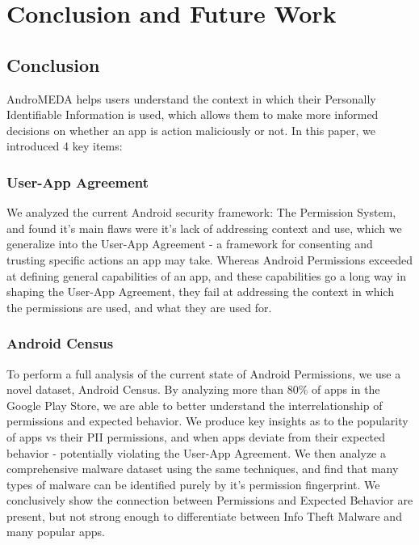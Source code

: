 \chapter{Conclusion and Future Work}
\label{sec:conclusion}
\section{Conclusion}
AndroMEDA helps users understand the context in which their Personally Identifiable Information is used, which allows them to make more informed decisions on whether an app is action maliciously or not. In this paper, we introduced 4 key items:

\subsection{User-App Agreement}

We analyzed the current Android security framework: The Permission System, and found it's main flaws were it's lack of addressing context and use, which we generalize into the User-App Agreement - a framework for consenting and trusting specific actions an app may take. Whereas Android Permissions exceeded at defining general capabilities of an app, and these capabilities go a long way in shaping the User-App Agreement, they fail at addressing the context in which the permissions are used, and what they are used for.

\subsection{Android Census}
To perform a full analysis of the current state of Android Permissions, we use a novel dataset, Android Census. By analyzing more than 80\% of apps in the Google Play Store, we are able to better understand the interrelationship of permissions and expected behavior. We produce key insights as to the popularity of apps vs their PII permissions, and when apps deviate from their expected behavior - potentially violating the User-App Agreement. We then analyze a comprehensive malware dataset using the same techniques, and find that many types of malware can be identified purely by it's permission fingerprint. We conclusively show the connection between Permissions and Expected Behavior are present, but not strong enough to differentiate between Info Theft Malware and many popular apps.

